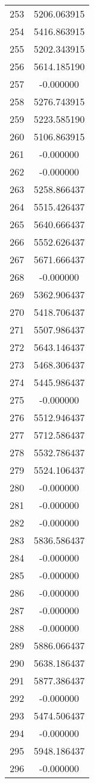 \documentclass[12pt]{article}
\begin{document}
\begin{longtable}{@{}cc@{}}
253 & 5206.063915 \\
254 & 5416.863915 \\
255 & 5202.343915 \\
256 & 5614.185190 \\
257 & -0.000000 \\
258 & 5276.743915 \\
259 & 5223.585190 \\
260 & 5106.863915 \\
261 & -0.000000 \\
262 & -0.000000 \\
263 & 5258.866437 \\
264 & 5515.426437 \\
265 & 5640.666437 \\
266 & 5552.626437 \\
267 & 5671.666437 \\
268 & -0.000000 \\
269 & 5362.906437 \\
270 & 5418.706437 \\
271 & 5507.986437 \\
272 & 5643.146437 \\
273 & 5468.306437 \\
274 & 5445.986437 \\
275 & -0.000000 \\
276 & 5512.946437 \\
277 & 5712.586437 \\
278 & 5532.786437 \\
279 & 5524.106437 \\
280 & -0.000000 \\
281 & -0.000000 \\
282 & -0.000000 \\
283 & 5836.586437 \\
284 & -0.000000 \\
285 & -0.000000 \\
286 & -0.000000 \\
287 & -0.000000 \\
288 & -0.000000 \\
289 & 5886.066437 \\
290 & 5638.186437 \\
291 & 5877.386437 \\
292 & -0.000000 \\
293 & 5474.506437 \\
294 & -0.000000 \\
295 & 5948.186437 \\
296 & -0.000000 \\

\end{longtable}
\end{document}
